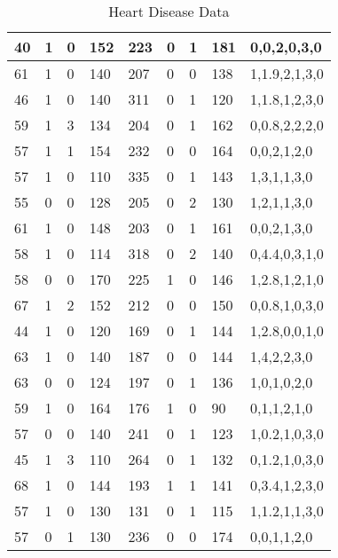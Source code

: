\documentclass{article}
\begin{document}
\begin{table}[h!]
\begin{tabular}{|l|l|l|l|l|l|l|l|l|}
40 & 1 & 0 & 152 & 223 & 0 & 1 & 181 & 0,0,2,0,3,0 \\ \hline
61 & 1 & 0 & 140 & 207 & 0 & 0 & 138 & 1,1.9,2,1,3,0 \\ \hline
46 & 1 & 0 & 140 & 311 & 0 & 1 & 120 & 1,1.8,1,2,3,0 \\ \hline
59 & 1 & 3 & 134 & 204 & 0 & 1 & 162 & 0,0.8,2,2,2,0 \\ \hline
57 & 1 & 1 & 154 & 232 & 0 & 0 & 164 & 0,0,2,1,2,0 \\ \hline
57 & 1 & 0 & 110 & 335 & 0 & 1 & 143 & 1,3,1,1,3,0 \\ \hline
55 & 0 & 0 & 128 & 205 & 0 & 2 & 130 & 1,2,1,1,3,0 \\ \hline
61 & 1 & 0 & 148 & 203 & 0 & 1 & 161 & 0,0,2,1,3,0 \\ \hline
58 & 1 & 0 & 114 & 318 & 0 & 2 & 140 & 0,4.4,0,3,1,0 \\ \hline
58 & 0 & 0 & 170 & 225 & 1 & 0 & 146 & 1,2.8,1,2,1,0 \\ \hline
67 & 1 & 2 & 152 & 212 & 0 & 0 & 150 & 0,0.8,1,0,3,0 \\ \hline
44 & 1 & 0 & 120 & 169 & 0 & 1 & 144 & 1,2.8,0,0,1,0 \\ \hline
63 & 1 & 0 & 140 & 187 & 0 & 0 & 144 & 1,4,2,2,3,0 \\ \hline
63 & 0 & 0 & 124 & 197 & 0 & 1 & 136 & 1,0,1,0,2,0 \\ \hline
59 & 1 & 0 & 164 & 176 & 1 & 0 & 90 & 0,1,1,2,1,0 \\ \hline
57 & 0 & 0 & 140 & 241 & 0 & 1 & 123 & 1,0.2,1,0,3,0 \\ \hline
45 & 1 & 3 & 110 & 264 & 0 & 1 & 132 & 0,1.2,1,0,3,0 \\ \hline
68 & 1 & 0 & 144 & 193 & 1 & 1 & 141 & 0,3.4,1,2,3,0 \\ \hline
57 & 1 & 0 & 130 & 131 & 0 & 1 & 115 & 1,1.2,1,1,3,0 \\ \hline
57 & 0 & 1 & 130 & 236 & 0 & 0 & 174 & 0,0,1,1,2,0 \\ \hline
\end{tabular}
\caption{Heart Disease Data}
\end{table}
\end{document}
